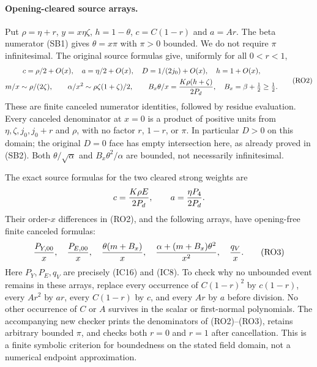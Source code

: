 \paragraph{Opening-cleared source arrays.}
Put $\rho=\eta+r$, $y=x\eta\zeta$, $h=1-\theta$,
$c=C(1-r)$ and $a=Ar$. The beta numerator (SB1) gives
$\theta=x\pi$ with $\pi>0$ bounded. We do not require $\pi$
infinitesimal. The original source formulas give, uniformly for
all $0<r<1$,
\[
\begin{gathered}
 c=\rho/2+O(x),\quad a=\eta/2+O(x),\quad
 D=1/(2j_0)+O(x),\quad h=1+O(x),\\
 m/x\sim\rho/(2\zeta),\qquad
 \alpha/x^2\sim\rho\zeta(1+\zeta)/2,\qquad
 B_x\theta/x={K\rho(h+\zeta)\over2P_d},\quad
 B_x=\beta+\tfrac12\ge\tfrac12.                      
\end{gathered} \tag{RO2}
\]
These are finite canceled numerator identities, followed by residue
evaluation. Every canceled denominator at $x=0$ is a product of
positive units from $\eta,\zeta,j_0,j_0+r$ and $\rho$, with no
factor $r$, $1-r$, or $\pi$. In particular $D>0$ on this domain;
the original $D=0$ face has empty intersection here, as already proved
in (SB2). Both $\theta/\sqrt\alpha$ and
$B_x\theta^2/\alpha$ are bounded, not necessarily infinitesimal.

The exact source formulas for the two cleared strong weights are
\[
 c={K\rho E\over2P_d},\qquad a={\eta P_4\over2P_d}.
\]
Their order-$x$ differences in (RO2), and the following arrays, have
opening-free finite canceled formulas:
\[
 {P_{Y,00}\over x},\quad {P_{E,00}\over x},\quad
 {\theta(m+B_x)\over x},\quad
 {\alpha+(m+B_x)\theta^2\over x^2},\quad {q_V\over x}.
                                                               \tag{RO3}
\]
Here $P_Y,P_E,q_V$ are precisely (IC16) and (IC8). To check why no
unbounded event remains in these arrays, replace every occurrence of
$C(1-r)^2$ by $c(1-r)$, every $Ar^2$ by $ar$, every
$C(1-r)$ by $c$, and every $Ar$ by $a$ before division. No other
occurrence of $C$ or $A$ survives in the scalar or first-normal
polynomials. The accompanying new checker prints the denominators of
(RO2)--(RO3), retains arbitrary bounded $\pi$, and checks both
$r=0$ and $r=1$ after cancellation. This is a finite symbolic
criterion for boundedness on the stated field domain, not a numerical
endpoint approximation.

